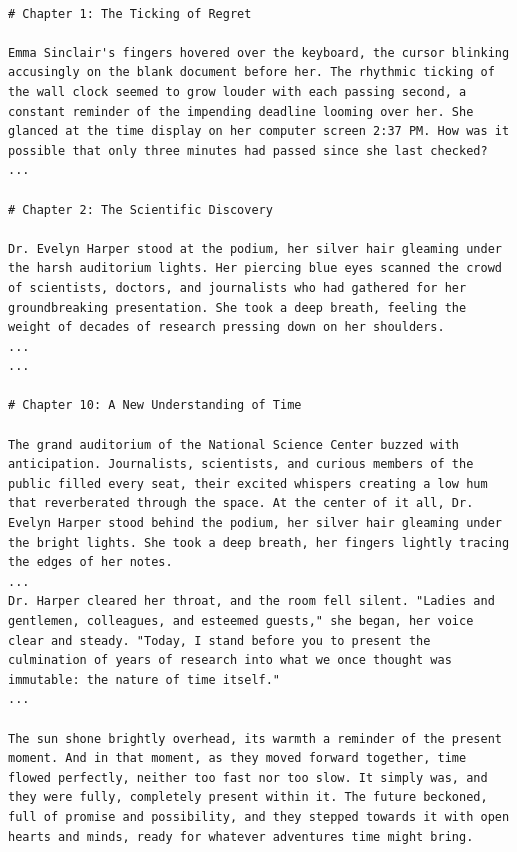 \label{appendix:AFLOW generate novel}

\begin{tcolorbox}[title={\textbf{\small AFlow-Generated Novel}}, boxrule=2pt, arc=0mm, breakable]\begin{verbatim}

# Chapter 1: The Ticking of Regret

Emma Sinclair's fingers hovered over the keyboard, the cursor blinking accusingly on the blank document before her. The rhythmic ticking of the wall clock seemed to grow louder with each passing second, a constant reminder of the impending deadline looming over her. She glanced at the time display on her computer screen 2:37 PM. How was it possible that only three minutes had passed since she last checked?
...

# Chapter 2: The Scientific Discovery

Dr. Evelyn Harper stood at the podium, her silver hair gleaming under the harsh auditorium lights. Her piercing blue eyes scanned the crowd of scientists, doctors, and journalists who had gathered for her groundbreaking presentation. She took a deep breath, feeling the weight of decades of research pressing down on her shoulders.
...
...

# Chapter 10: A New Understanding of Time

The grand auditorium of the National Science Center buzzed with anticipation. Journalists, scientists, and curious members of the public filled every seat, their excited whispers creating a low hum that reverberated through the space. At the center of it all, Dr. Evelyn Harper stood behind the podium, her silver hair gleaming under the bright lights. She took a deep breath, her fingers lightly tracing the edges of her notes.
...
Dr. Harper cleared her throat, and the room fell silent. "Ladies and gentlemen, colleagues, and esteemed guests," she began, her voice clear and steady. "Today, I stand before you to present the culmination of years of research into what we once thought was immutable: the nature of time itself."
...

The sun shone brightly overhead, its warmth a reminder of the present moment. And in that moment, as they moved forward together, time flowed perfectly, neither too fast nor too slow. It simply was, and they were fully, completely present within it. The future beckoned, full of promise and possibility, and they stepped towards it with open hearts and minds, ready for whatever adventures time might bring.

\end{verbatim}
\end{tcolorbox}

